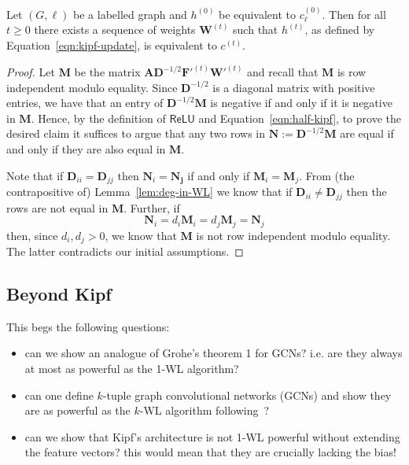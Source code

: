 \begin{theorem}
    Let $(G,\ell)$ be a labelled graph and $h^{(0)}$ be equivalent
    to $c_\ell^{(0)}$. Then for all $t \geq 0$
    there exists a sequence of weights $\mathbf{W}^{(t)}$ such that
    $h^{(t)}$, as defined by Equation~\eqref{eqn:kipf-update},
    is equivalent to $c^{(t)}$.
\end{theorem}
\begin{proof}
  Let $\mathbf{M}$ be the matrix $\mathbf{AD}^{-1/2}\mathbf{F'}^{(t)}\mathbf{W'}^{(t)}$
  and recall that $\mathbf{M}$ is row independent modulo equality.
  Since $\mathbf{D}^{-1/2}$ is a diagonal matrix with positive entries, we
  have that an entry of $\mathbf{D}^{-1/2}\mathbf{M}$ is negative if and only
  if it is negative in $\mathbf{M}$. Hence, by the definition of
  $\mathsf{ReLU}$ and Equation~\eqref{eqn:half-kipf}, to prove the desired
  claim it suffices to argue that any two rows in
  $\mathbf{N} := \mathbf{D}^{-1/2}\mathbf{M}$ are equal if and only if they
  are also equal in $\mathbf{M}$.
  
  Note that if $\mathbf{D}_{ii} = \mathbf{D}_{jj}$ then $\mathbf{N}_i =
  \mathbf{N_j}$ if and only if $\mathbf{M}_i = \mathbf{M}_j$. From (the
  contrapositive of) Lemma~\ref{lem:deg-in-WL} we know that if
  $\mathbf{D}_{ii} \neq \mathbf{D}_{jj}$ then the rows are not equal in
  $\mathbf{M}$. Further, if
  \[
    \mathbf{N}_{i} = d_i \mathbf{M}_i = d_j \mathbf{M}_j = \mathbf{N}_j
  \]
  then, since $d_i,d_j > 0$, we know that $\mathbf{M}$ is not row independent
  modulo equality. The latter contradicts our initial assumptions.
\end{proof}

\subsection{Beyond Kipf}
This begs the
following questions:
\begin{itemize}
    \item can we show an analogue of Grohe's theorem 1 for GCNs? i.e. are they always at most as powerful as the 1-WL algorithm? 
    \item can one define $k$-tuple graph convolutional networks (GCNs) and show
they are as powerful as the $k$-WL algorithm
following~\cite[Proposition 4]{grohewl}?
    \item can we show that Kipf's architecture is not 1-WL powerful without
      extending the feature vectors? this would mean that they are crucially
      lacking the bias!
\end{itemize}


